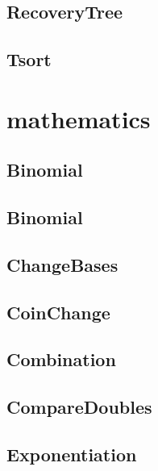 \subsection{ RecoveryTree}
\raggedbottom
\hrulefill
\subsection{ Tsort}
\raggedbottom
\hrulefill

\section{mathematics}
\subsection{ Binomial}
\raggedbottom
\hrulefill
\subsection{ Binomial}
\raggedbottom
\hrulefill
\subsection{ ChangeBases}
\raggedbottom
\hrulefill
\subsection{ CoinChange}
\raggedbottom
\hrulefill
\subsection{ Combination}
\raggedbottom
\hrulefill
\subsection{ CompareDoubles}
\raggedbottom
\hrulefill
\subsection{ Exponentiation}
\raggedbottom
\hrulefill
